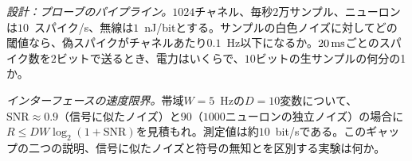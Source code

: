 \begin{exercise}[\lvlB]
\label{ex:17:6}
\emph{設計：プローブのパイプライン。}$1024$チャネル、毎秒$2$万サンプル、ニューロンは$10$~スパイク/s、無線は$1$~nJ/bitとする。サンプルの白色ノイズに対してどの閾値なら、偽スパイクがチャネルあたり$0.1$~Hz以下になるか。$20\,\text{ms}$ごとのスパイク数を$2$ビットで送るとき、電力はいくらで、$10$ビットの生サンプルの何分の1か。
\end{exercise}

\begin{exercise}[\lvlC]
\label{ex:17:7}
\emph{インターフェースの速度限界。}帯域$W=5$~Hzの$D=10$変数について、$\text{SNR}\approx0.9$（信号に似たノイズ）と$90$（$1000$ニューロンの独立ノイズ）の場合に$R\le DW\log_2(1+\text{SNR})$を見積もれ。測定値は約$10$~bit/sである。このギャップの二つの説明、信号に似たノイズと符号の無知とを区別する実験は何か。
\end{exercise}
